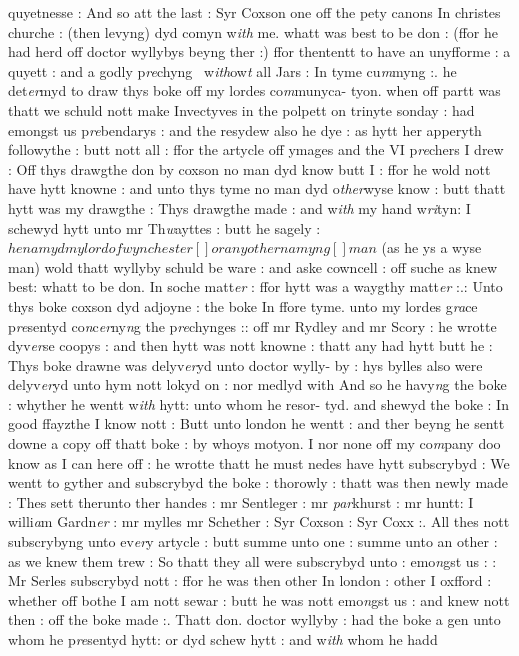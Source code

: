 \documentclass[12pt, a4paper]{book}
\begin{document}
            		
            		quyetnesse : And so att the last : Syr Coxson one off the pety canons In  christes churche : (then levyng) dyd comyn w\textit{ith} me. whatt was best to be don : (ffor he had herd off doctor wyllybys beyng ther :) ffor thententt to have an unyfforme : a quyett : and a godly p\textit{re}chyng  w\textit{ith}ow\textit{t} all Jars : In tyme cu\textit{m}myng :. he det\textit{er}myd to draw thys boke off my lordes co\textit{m}munyca- tyon. when off partt was thatt we schuld nott make Invectyves in the polpett
			 on trinyte sonday : had emongst us p\textit{re}bendarys : and the resydew also he dye
			 : as hytt her apperyth
			 followythe : butt nott all : ffor the artycle off ymages and the VI p\textit{re}chers I drew : Off thys drawgthe don by coxson no man dyd know butt I :  ffor he wold nott have hytt knowne : and unto thys tyme no man dyd o\textit{ther}wyse know : butt thatt hytt was my drawgthe : Thys drawgthe made : and w\textit{ith} my hand w\textit{ri}tyn: I schewyd hytt unto mr Th\textit{w}ayttes : butt he sagely : $he namyd my lord of wynchester [  ]or any other namy\textit{n}g [  ]man$ (as he ys a wyse man) wold thatt wyllyby schuld be ware : and aske cowncell : off suche as knew best: whatt to be don. In soche matt\textit{er }: ffor hytt was a waygthy matt\textit{er} :.: Unto thys boke coxson dyd adjoyne : the boke In ffore tyme. unto my lordes g\textit{ra}ce p\textit{re}sentyd co\textit{n}c\textit{er}ny\textit{n}g the p\textit{re}chynges :: off mr Rydley and mr Scory : he wrotte dyv\textit{er}se coopys : and then hytt was nott knowne : thatt any had hytt butt he : Thys boke drawne was delyv\textit{er}yd unto doctor wylly- by : hys bylles also were delyv\textit{er}yd unto hym nott lokyd on : nor medlyd with And so he havy\textit{n}g the boke : whyther he wentt w\textit{ith} hytt: unto whom he resor- tyd. and shewyd the boke : In good ffayzthe I know nott : Butt unto  london he wentt : and ther beyng he sentt downe a copy off thatt boke : by whoys motyon. I nor none off my co\textit{m}pany doo know as I can here off 
			: he wrotte thatt he must nedes have hytt subscrybyd : We wentt to gyther and subscrybyd the boke : thorowly : thatt was then newly made : Thes sett therunto ther handes : mr Sentleger : mr \textit{par}khurst : mr huntt: I willi\textit{a}m Gardn\textit{er} : mr mylles mr Schether : Syr Coxson : Syr Coxx :. All thes nott subscrybyng unto ev\textit{er}y artycle : butt summe unto one : summe unto an other : as we knew them trew : So thatt they all were subscrybyd unto : emo\textit{n}gst us : : Mr Serles subscrybyd nott : ffor he was then other In london : other I oxfford : whether off bothe I am nott sewar : butt he was nott emo\textit{n}gst us : and knew nott then : off the boke made :. Thatt don. doctor wyllyby : had the boke a gen  unto whom he p\textit{re}sentyd hytt: or dyd schew hytt : and w\textit{ith} whom he hadd
            		
\end{document}
